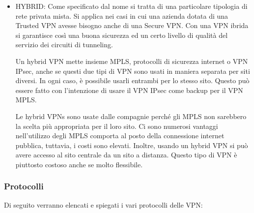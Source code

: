 \begin{itemize}
    \item HYBRID: Come specificato dal nome si tratta di una particolare tipologia di rete privata mista. Si applica nei casi in cui una azienda dotata di una Trusted VPN avesse bisogno anche di una Secure VPN. Con una VPN ibrida si garantisce così una buona sicurezza ed un certo livello di qualità del servizio dei circuiti di tunneling.
    
    Un hybrid VPN mette insieme MPLS, protocolli di sicurezza internet o VPN IPsec, anche se questi due tipi di VPN sono usati in maniera separata per siti diversi. In ogni caso, è possibile usarli entrambi per lo stesso sito. Questo può essere fatto con l’intenzione di usare il VPN IPsec come backup per il VPN MPLS.

    Le hybrid VPNs sono usate dalle compagnie perché gli MPLS non sarebbero la scelta più appropriata per il loro sito. Ci sono numerosi vantaggi nell’utilizzo degli MPLS comporta al posto della connessione internet pubblica, tuttavia, i costi sono elevati. Inoltre, usando un hybrid VPN si può avere accesso al sito centrale da un sito a distanza. Questo tipo di VPN è piuttosto costoso anche se molto flessibile.
\end{itemize}

\subsubsection{Protocolli}
Di seguito verranno elencati e spiegati i vari protocolli delle VPN:

